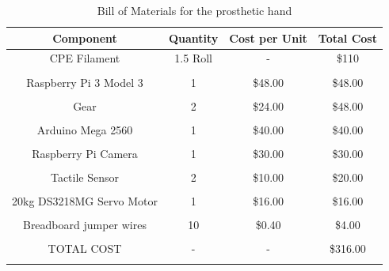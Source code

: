 \documentclass[11.5pt]{article}
\begin{document}
\begin{table}[H]
    \centering
    \caption{Bill of Materials for the prosthetic hand}
    \vspace{3mm}
    \begin{tabular}{cccc}
    \hline
         Component & Quantity & Cost per Unit & Total Cost \\
         \hline
            CPE Filament & 1.5 Roll & - & \$110\\\\
            Raspberry Pi 3 Model 3 & 1 & \$48.00 & \$48.00\\\\
            Gear & 2 & \$24.00 & \$48.00\\\\
            Arduino Mega 2560 & 1 & \$40.00 & \$40.00\\\\
            Raspberry Pi Camera & 1 & \$30.00 & \$30.00\\\\
            Tactile Sensor & 2 & \$10.00 & \$20.00\\\\
            20kg DS3218MG Servo Motor & 1 & \$16.00 & \$16.00\\\\
            Breadboard jumper wires & 10 & \$0.40 & \$4.00\\\\
            TOTAL COST & - & -  & \$316.00\\\\
    \hline
    \end{tabular}
    \label{tab:BOM}
\end{table}

\newpage
\end{document}
